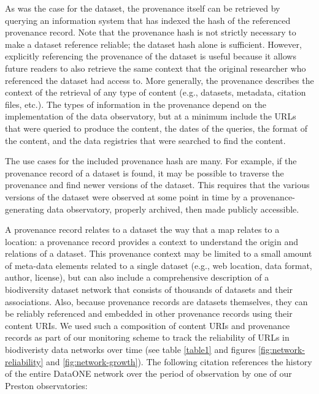 As was the case for the dataset, the provenance itself can be retrieved by querying an information system that has indexed the hash of the referenced provenance record. Note that the provenance hash is not strictly necessary to make a dataset reference reliable; the dataset hash alone is sufficient. However, explicitly referencing the provenance of the dataset is useful because it allows future readers to also retrieve the same context that the original researcher who referenced the dataset had access to. More generally, the provenance describes the context of the retrieval of any type of content (e.g., datasets, metadata, citation files, etc.). The types of information in the provenance depend on the implementation of the data observatory, but at a minimum include the URLs that were queried to produce the content, the dates of the queries, the format of the content, and the data registries that were searched to find the content.

% 

The use cases for the included provenance hash are many. For example, if the provenance record of a dataset is found, it may be possible to traverse the provenance and find newer versions of the dataset. This requires that the various versions of the dataset were observed at some point in time by a provenance-generating data observatory, properly archived, then made publicly accessible.

A provenance record relates to a dataset the way that a map relates to a location: a provenance record provides a context to understand the origin and relations of a dataset. This provenance context may be limited to a small amount of meta-data elements related to a single dataset (e.g., web location, data format, author, license), but can also include a comprehensive description of a biodiversity dataset network that consists of thousands of datasets and their associations. Also, because provenance records are datasets themselves, they can be reliably referenced and embedded in other provenance records using their content URIs. We used such a composition of content URIs and provenance records as part of our monitoring scheme \citep{jorrit_poelen_2018_1410543} to track the reliability of URLs in biodiveristy data networks over time (see table \ref{table1} and figures \ref{fig:network-reliability} and \ref{fig:network-growth}). The following citation references the history of the entire DataONE network over the period of observation by one of our Preston observatories:

